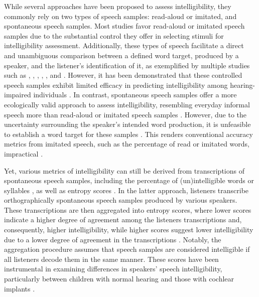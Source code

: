 \documentclass[
  authoryear,
  preprint,
  1p]{elsarticle}
\begin{document}
While several approaches have been proposed to assess intelligibility,
they commonly rely on two types of speech samples: read-aloud or
imitated, and spontaneous speech samples. Most studies favor read-aloud
or imitated speech samples due to the substantial control they offer in
selecting stimuli for intelligibility assessment. Additionally, these
types of speech facilitate a direct and unambiguous comparison between a
defined word target, produced by a speaker, and the listener's
identification of it, as exemplified by multiple studies such as
\citet{Castellanos_et_al_2014}, \citet{Chin_et_al_2012},
\citet{Chin_et_al_2014}, \citet{Freeman_et_al_2017},
\citet{Khwaileh_et_al_2010}, and \citet{Montag_et_al_2014}. However, it
has been demonstrated that these controlled speech samples exhibit
limited efficacy in predicting intelligibility among hearing-impaired
individuals \citep{Cox_et_al_1989, Ertmer_2011}. In contrast,
spontaneous speech samples offer a more ecologically valid approach to
assess intelligibility, resembling everyday informal speech more than
read-aloud or imitated speech samples \citep{Boonen_et_al_2023}.
However, due to the uncertainty surrounding the speaker's intended word
production, it is unfeasible to establish a word target for these
samples \citep{Flipsen_2006, Lagerberg_et_al_2014}. This renders
conventional accuracy metrics from imitated speech, such as the
percentage of read or imitated words, impractical
\citep{Boonen_et_al_2023}.

Yet, various metrics of intelligibility can still be derived from
transcriptions of spontaneous speech samples, including the percentage
of (un)intelligible words or syllables
\citep{Flipsen_2006, Lagerberg_et_al_2014}, as well as entropy scores
\citep{Boonen_et_al_2023}. In the latter approach, listeners transcribe
orthographically spontaneous speech samples produced by various
speakers. These transcriptions are then aggregated into entropy scores,
where lower scores indicate a higher degree of agreement among the
listeners transcriptions and, consequently, higher intelligibility,
while higher scores suggest lower intelligibility due to a lower degree
of agreement in the transcriptions
\citep{Boonen_et_al_2023, Faes_et_al_2022}. Notably, the aggregation
procedure assumes that speech samples are considered intelligible if all
listeners decode them in the same manner. These scores have been
instrumental in examining differences in speakers' speech
intelligibility, particularly between children with normal hearing and
those with cochlear implants \citep{Boonen_et_al_2023}.
\end{document}
